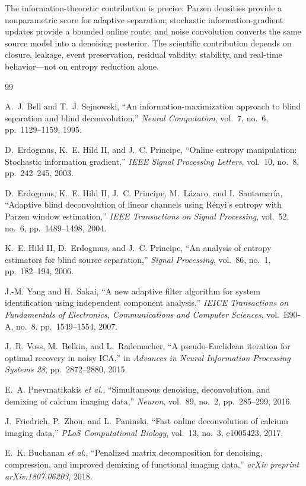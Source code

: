\documentclass[11pt]{article}
\begin{document}
The information-theoretic contribution is precise: Parzen densities provide a
nonparametric score for adaptive separation; stochastic information-gradient
updates provide a bounded online route; and noise convolution converts the same
source model into a denoising posterior. The scientific contribution depends on
closure, leakage, event preservation, residual validity, stability, and real-time
behavior---not on entropy reduction alone.

\begin{thebibliography}{99}

A.~J. Bell and T.~J. Sejnowski,
``An information-maximization approach to blind separation and blind
deconvolution,''
\emph{Neural Computation}, vol.~7, no.~6, pp.~1129--1159, 1995.

D.~Erdogmus, K.~E. Hild II, and J.~C. Principe,
``Online entropy manipulation: Stochastic information gradient,''
\emph{IEEE Signal Processing Letters}, vol.~10, no.~8, pp.~242--245, 2003.

D.~Erdogmus, K.~E. Hild II, J.~C. Principe, M.~L\'azaro, and I.~Santamar\'ia,
``Adaptive blind deconvolution of linear channels using R\'enyi's entropy with
Parzen window estimation,''
\emph{IEEE Transactions on Signal Processing}, vol.~52, no.~6,
pp.~1489--1498, 2004.

K.~E. Hild II, D.~Erdogmus, and J.~C. Principe,
``An analysis of entropy estimators for blind source separation,''
\emph{Signal Processing}, vol.~86, no.~1, pp.~182--194, 2006.

J.-M. Yang and H.~Sakai,
``A new adaptive filter algorithm for system identification using independent
component analysis,''
\emph{IEICE Transactions on Fundamentals of Electronics, Communications and
Computer Sciences}, vol.~E90-A, no.~8, pp.~1549--1554, 2007.

J.~R. Voss, M.~Belkin, and L.~Rademacher,
``A pseudo-Euclidean iteration for optimal recovery in noisy ICA,''
in \emph{Advances in Neural Information Processing Systems 28},
pp.~2872--2880, 2015.

E.~A. Pnevmatikakis \emph{et al.},
``Simultaneous denoising, deconvolution, and demixing of calcium imaging data,''
\emph{Neuron}, vol.~89, no.~2, pp.~285--299, 2016.

J.~Friedrich, P.~Zhou, and L.~Paninski,
``Fast online deconvolution of calcium imaging data,''
\emph{PLoS Computational Biology}, vol.~13, no.~3, e1005423, 2017.

E.~K. Buchanan \emph{et al.},
``Penalized matrix decomposition for denoising, compression, and improved
demixing of functional imaging data,''
\emph{arXiv preprint arXiv:1807.06203}, 2018.

\end{thebibliography}
\end{document}
